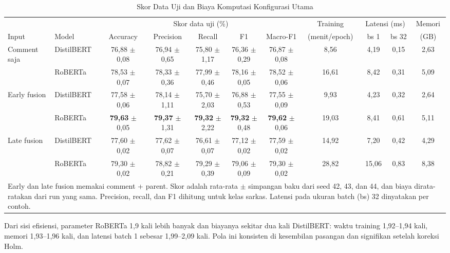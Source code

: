 \documentclass[conference]{IEEEtran}
\begin{document}
\begin{table}[t]
\caption{Skor Data Uji dan Biaya Komputasi Konfigurasi Utama}
\label{tab:main}
\centering
\footnotesize
\setlength{\tabcolsep}{3pt}
\begin{tabular}{llccccccccc}
\hline
 & & \multicolumn{5}{c}{Skor data uji (\%)} & Training & \multicolumn{2}{c}{Latensi (ms)} & Memori \\
Input & Model & Accuracy & Precision & Recall & F1 & Macro-F1 & (menit/epoch) & bs 1 & bs 32 & (GB) \\
\hline
Comment saja & DistilBERT & 76,88 $\pm$ 0,08 & 76,94 $\pm$ 0,65 & 75,80 $\pm$ 1,17 & 76,36 $\pm$ 0,29 & 76,87 $\pm$ 0,08 & 8,56 & 4,19 & 0,15 & 2,63 \\
 & RoBERTa & 78,53 $\pm$ 0,07 & 78,33 $\pm$ 0,36 & 77,99 $\pm$ 0,46 & 78,16 $\pm$ 0,05 & 78,52 $\pm$ 0,06 & 16,61 & 8,42 & 0,31 & 5,09 \\
Early fusion & DistilBERT & 77,58 $\pm$ 0,06 & 78,14 $\pm$ 1,11 & 75,70 $\pm$ 2,03 & 76,88 $\pm$ 0,53 & 77,55 $\pm$ 0,09 & 9,93 & 4,23 & 0,32 & 2,64 \\
 & RoBERTa & \textbf{79,63} $\pm$ 0,05 & \textbf{79,37} $\pm$ 1,31 & \textbf{79,32} $\pm$ 2,22 & \textbf{79,32} $\pm$ 0,48 & \textbf{79,62} $\pm$ 0,06 & 19,03 & 8,41 & 0,61 & 5,11 \\
Late fusion & DistilBERT & 77,60 $\pm$ 0,02 & 77,62 $\pm$ 0,07 & 76,61 $\pm$ 0,07 & 77,12 $\pm$ 0,02 & 77,59 $\pm$ 0,02 & 14,92 & 7,20 & 0,42 & 4,29 \\
 & RoBERTa & 79,30 $\pm$ 0,02 & 78,82 $\pm$ 0,21 & 79,29 $\pm$ 0,39 & 79,06 $\pm$ 0,09 & 79,30 $\pm$ 0,02 & 28,82 & 15,06 & 0,83 & 8,38 \\
\hline
\multicolumn{11}{p{0.97\textwidth}}{Early dan late fusion memakai comment + parent. Skor adalah rata-rata $\pm$ simpangan baku dari seed 42, 43, dan 44, dan biaya dirata-ratakan dari run yang sama. Precision, recall, dan F1 dihitung untuk kelas sarkas. Latensi pada ukuran batch (bs) 32 dinyatakan per contoh.}
\end{tabular}
\end{table}

Dari sisi efisiensi, parameter RoBERTa 1,9 kali lebih banyak dan biayanya sekitar dua kali DistilBERT: waktu training 1,92--1,94 kali, memori 1,93--1,96 kali, dan latensi batch 1 sebesar 1,99--2,09 kali. Pola ini konsisten di kesembilan pasangan dan signifikan setelah koreksi Holm.
\end{document}
